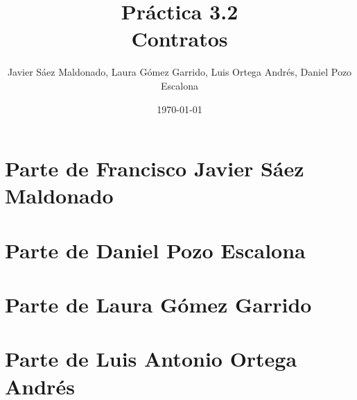 \documentclass[11pt]{article}
\title{\textbf{Práctica 3.2}\\
    		Contratos}
\author{Javier Sáez Maldonado, Laura Gómez Garrido, Luis Ortega Andrés, Daniel Pozo Escalona}
\date{\today}
\begin{document}
\maketitle

\section{Parte de Francisco Javier Sáez Maldonado}

 \newpage

\section{Parte de Daniel Pozo Escalona}
 \newpage

\section{Parte de Laura Gómez Garrido} 

 \newpage

\section{Parte de Luis Antonio Ortega Andrés}

 
 
 
 
 
 
\end{document}
